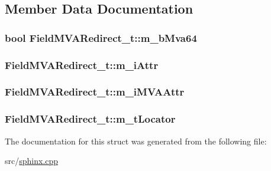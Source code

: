 \subsection{Member Data Documentation}
\hypertarget{structFieldMVARedirect__t_a239b13ccda58a4bb994d4bf05ffe059e}{
\subsubsection[{m\-\_\-b\-Mva64}]{\setlength{\rightskip}{0pt plus 5cm}bool Field\-M\-V\-A\-Redirect\-\_\-t\-::m\-\_\-b\-Mva64}}\label{structFieldMVARedirect__t_a239b13ccda58a4bb994d4bf05ffe059e}
\hypertarget{structFieldMVARedirect__t_a80b6f9b763e62c87233b7dcef7e3eda3}{
\subsubsection[{m\-\_\-i\-Attr}]{ Field\-M\-V\-A\-Redirect\-\_\-t\-::m\-\_\-i\-Attr}}\label{structFieldMVARedirect__t_a80b6f9b763e62c87233b7dcef7e3eda3}
\hypertarget{structFieldMVARedirect__t_a0854c1a3c9fbd6ca08939ddeb3db5325}{
\subsubsection[{m\-\_\-i\-M\-V\-A\-Attr}]{ Field\-M\-V\-A\-Redirect\-\_\-t\-::m\-\_\-i\-M\-V\-A\-Attr}}\label{structFieldMVARedirect__t_a0854c1a3c9fbd6ca08939ddeb3db5325}
\hypertarget{structFieldMVARedirect__t_adfc8cbe536fa8dd1efed1fa5b46f7e07}{
\subsubsection[{m\-\_\-t\-Locator}]{ Field\-M\-V\-A\-Redirect\-\_\-t\-::m\-\_\-t\-Locator}}\label{structFieldMVARedirect__t_adfc8cbe536fa8dd1efed1fa5b46f7e07}


The documentation for this struct was generated from the following file\-:\begin{DoxyCompactItemize}
\item 
src/\hyperlink{sphinx_8cpp}{sphinx.\-cpp}\end{DoxyCompactItemize}
